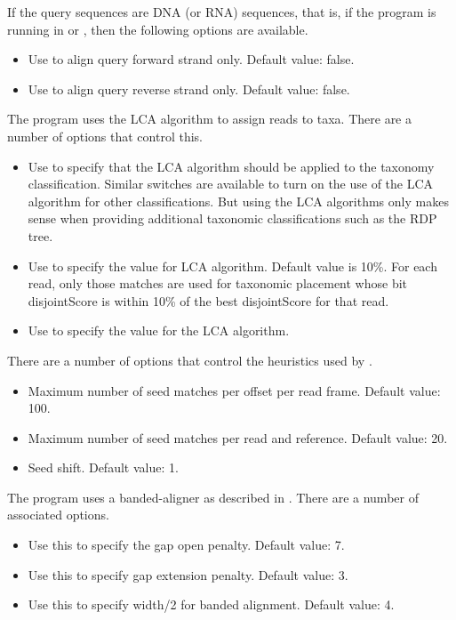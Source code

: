 \documentclass[11pt]{article}
\begin{document}
If the query sequences are DNA (or RNA) sequences, that is, if the program is running in  {}
or  , then the following options are available.
\begin{itemize}
\setlength{\itemindent}{30pt}
\item[\itt{--forwardOnly}]       Use to align query forward strand only. Default value: false.
\item[\itt{ --reverseOnly}]       Use to align query reverse strand only. Default value: false.
\end{itemize}

The program uses the LCA algorithm \cite{MEGAN2007} to assign reads to taxa. There are a number of options that control this.
\begin{itemize}
\setlength{\itemindent}{30pt}
\item[\itt{lca\_taxonomy}] Use to specify that the LCA algorithm should be applied to the taxonomy classification. Similar switches are available to turn on the use of the LCA algorithm for other classifications.
But using the LCA algorithms only makes sense when providing additional taxonomic classifications such as the RDP tree.
\item[\itt{--topPercent}]          Use to specify the  value for LCA algorithm. Default value is 10\%. For each read,
only those matches are used for taxonomic placement whose bit disjointScore is within 10\% of the best disjointScore for that read.
\item[\itt{--minSupport}]           Use to specify the  value for the LCA algorithm. 
\end{itemize}

There are a number of options that control the heuristics used by .
\begin{itemize}
\setlength{\itemindent}{30pt}
\item[{\itt{--maxSeedsPerFrame}}]   Maximum number of seed matches per offset per read frame. Default value: 100.
\item[{\itt{--maxSeedsPerRef}}]      Maximum number of seed matches per read and reference. Default value: 20.
\item[\itt{ --seedShift}]            Seed shift. Default value: 1.
\end{itemize}

The program uses a banded-aligner as described in \cite{ChaoPM92}. There are a number of associated options.
\begin{itemize}
\setlength{\itemindent}{30pt}
\item[\itt{--gapOpen}]             Use this to specify the gap open penalty. Default value: 7.
\item[\itt{--gapExtend}]            Use this to specify  gap extension penalty. Default value: 3.
\item[\itt{--band}]                 Use this to specify width/2 for banded alignment. Default value: 4.
\end{itemize}
\end{document}
